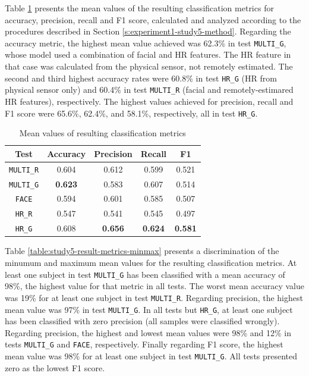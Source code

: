 Table \ref{table:study5-result-metrics-mean} presents the mean values of the resulting classification metrics for accuracy, precision, recall and F1 score, calculated and analyzed according to the procedures described in Section \ref{s:experiment1-study5-method}. Regarding the accuracy metric, the highest mean value achieved was 62.3\% in test \texttt{MULTI\_G}, whose model used a combination of facial and HR features. The HR feature in that case was calculated from the physical sensor, not remotely estimated. The second and third highest accuracy rates were 60.8\% in test \texttt{HR\_G} (HR from physical sensor only) and 60.4\% in test \texttt{MULTI\_R} (facial and remotely-estimared HR features), respectively. The highest values achieved for precision, recall and F1 score were 65.6\%, 62.4\%, and 58.1\%, respectively, all in test \texttt{HR\_G}.

\begin{table}
    \centering
    \caption{Mean values of resulting classification metrics}
    \label{table:study5-result-metrics-mean}
    \begin{tabular}[l]{@{}ccccc}
        \hline
            \textbf{Test} & \textbf{Accuracy} & \textbf{Precision} & \textbf{Recall} & \textbf{F1}\\
        \hline
            \texttt{MULTI\_R} & 0.604 & 0.612 & 0.599 & 0.521 \\ %
            \texttt{MULTI\_G} & \textbf{0.623} & 0.583 & 0.607 & 0.514 \\ %
            \texttt{FACE} & 0.594 & 0.601 & 0.585 & 0.507 \\ %
            \texttt{HR\_R} & 0.547 & 0.541 & 0.545 & 0.497 \\ %
            \texttt{HR\_G} & 0.608 & \textbf{0.656} & \textbf{0.624} & \textbf{0.581} \\ %
        \hline
    \end{tabular}
\end{table}

Table \ref{table:study5-result-metrics-minmax} presents a discrimination of the minumum and maximum mean values for the resulting classification metrics. At least one subject in test \texttt{MULTI\_G} has been classified with a mean accuracy of 98\%, the highest value for that metric in all tests. The worst mean accuracy value was 19\% for at least one subject in test \texttt{MULTI\_R}. Regarding precision, the highest mean value was 97\% in test \texttt{MULTI\_G}. In all tests but \texttt{HR\_G}, at least one subject has been classified with zero precision (all samples were classified wrongly). Regarding precision, the highest and lowest mean values were 98\% and 12\% in tests \texttt{MULTI\_G} and \texttt{FACE}, respectively. Finally regarding F1 score, the highest mean value was 98\% for at least one subject in test \texttt{MULTI\_G}. All tests presented zero as the lowest F1 score.

